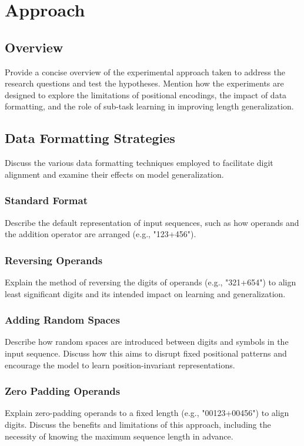 \chapter{Approach}
\label{chap:approach}

\section{Overview}
\label{sec:overview}
Provide a concise overview of the experimental approach taken to address the research questions and test the hypotheses. Mention how the experiments are designed to explore the limitations of positional encodings, the impact of data formatting, and the role of sub-task learning in improving length generalization.

\section{Data Formatting Strategies}
\label{sec:data_formatting}
Discuss the various data formatting techniques employed to facilitate digit alignment and examine their effects on model generalization.

\subsection{Standard Format}
Describe the default representation of input sequences, such as how operands and the addition operator are arranged (e.g., "123+456").

\subsection{Reversing Operands}
Explain the method of reversing the digits of operands (e.g., "321+654") to align least significant digits and its intended impact on learning and generalization.

\subsection{Adding Random Spaces}
Describe how random spaces are introduced between digits and symbols in the input sequence. Discuss how this aims to disrupt fixed positional patterns and encourage the model to learn position-invariant representations.

\subsection{Zero Padding Operands}
Explain zero-padding operands to a fixed length (e.g., "00123+00456") to align digits. Discuss the benefits and limitations of this approach, including the necessity of knowing the maximum sequence length in advance.

